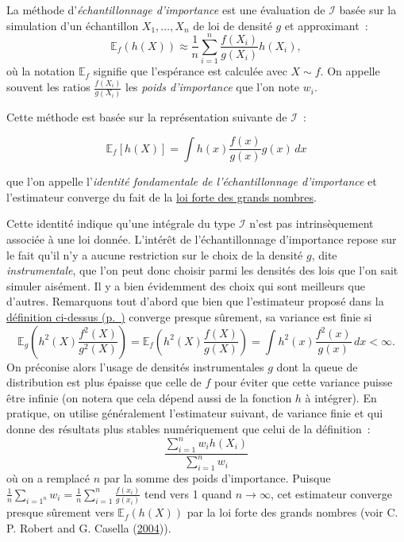 \begin{definition}\label{V-is}

La méthode d'\emph{échantillonnage d'importance} est une évaluation de
\(\mathcal{I}\) basée sur la simulation d'un échantillon
\(X_1, \ldots,X_n\) de loi de densité \(g\) et approximant~:
\[\mathbb{E}_{f}\left(h(X)\right)\approx \frac{1}{n}\sum_{i=1}^{n}\frac{f(X_i)}{g(X_i)}h(X_i),\]
où la notation \(\mathbb{E}_f\) signifie que l'espérance est calculée
avec \(X\sim f\). On appelle souvent les ratios
\(\frac{f(X_i)}{g(X_i)}\) les \emph{poids d'importance} que l'on note
\(w_i\).
\end{definition}

Cette méthode est basée sur la représentation suivante de
\(\mathcal{I}\)~:

\[\mathbb{E}_{f}\left[h(X)\right]=\int h(x)\frac{f(x)}{g(x)}g(x)\,dx\]

que l'on appelle l'\emph{identité fondamentale de l'échantillonnage
d'importance} et l'estimateur converge du fait de la
\protect\hyperref[II-lfgn]{loi forte des grands nombres}.

Cette identité indique qu'une intégrale du type \(\mathcal{I}\) n'est
pas intrinsèquement associée à une loi donnée. L'intérêt de
l'échantillonnage d'importance repose sur le fait qu'il n'y a aucune
restriction sur le choix de la densité \(g\), dite \emph{instrumentale},
que l'on peut donc choisir parmi les densités des lois que l'on sait
simuler aisément. Il y a bien évidemment des choix qui sont meilleurs
que d'autres. Remarquons tout d'abord que bien que l'estimateur proposé
dans la \protect\hyperref[V-is]{définition
ci-dessus (p.~\pageref*{V-is})} converge presque sûrement, sa variance
est finie si
\[\mathbb{E}_g\left(h^2(X)\frac{f^2(X)}{g^2(X)}\right) = \mathbb{E}_f\left(h^2(X)\frac{f(X)}{g(X)}\right) = \int h^2(x)\frac{f^2(x)}{g(x)}\,dx < \infty.\]
On préconise alors l'usage de densités instrumentales \(g\) dont la
queue de distribution est plus épaisse que celle de \(f\) pour éviter
que cette variance puisse être infinie (on notera que cela dépend aussi
de la fonction \(h\) à intégrer). En pratique, on utilise généralement
l'estimateur suivant, de variance finie et qui donne des résultats plus
stables numériquement que celui de la définition~:
\[\frac{\sum_{i=1}^{n}w_ih(X_i)}{\sum_{i=1}^n w_i}\] où on a remplacé
\(n\) par la somme des poids d'importance. Puisque
\(\frac{1}{n}\sum_{i=1^n}w_i = \frac{1}{n}\sum_{i=1}^n\frac{f(x_i)}{g(x_i)}\)
tend vers 1 quand \(n\to\infty\), cet estimateur converge presque
sûrement vers \(\mathbb{E}_{f}\left(h(X)\right)\) par la loi forte des
grands nombres (voir C. P. Robert and G. Casella
(\protect\hyperlink{refV-roca}{2004})).


